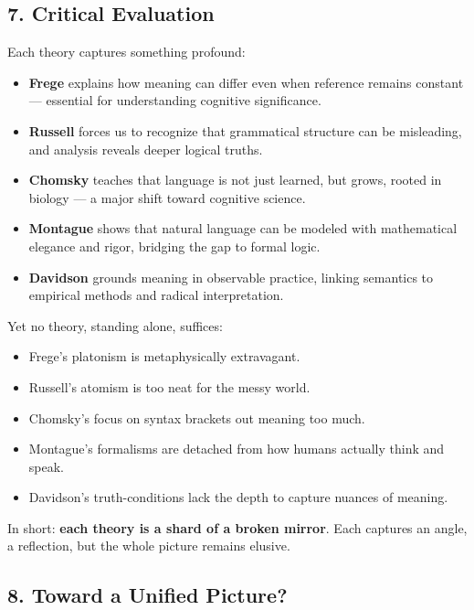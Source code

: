 \documentclass[12pt]{article}
\newcommand{\tightlist}{\itemsep 0pt\parskip 0pt\parsep 0pt}
\begin{document}
\hypertarget{critical-evaluation-1}{%
\subsection{7. Critical Evaluation}\label{critical-evaluation-1}}

Each theory captures something profound:

\begin{itemize}
\tightlist
\item
  \textbf{Frege} explains how meaning can differ even when reference
  remains constant --- essential for understanding cognitive
  significance.
\item
  \textbf{Russell} forces us to recognize that grammatical structure can
  be misleading, and analysis reveals deeper logical truths.
\item
  \textbf{Chomsky} teaches that language is not just learned, but grows,
  rooted in biology --- a major shift toward cognitive science.
\item
  \textbf{Montague} shows that natural language can be modeled with
  mathematical elegance and rigor, bridging the gap to formal logic.
\item
  \textbf{Davidson} grounds meaning in observable practice, linking
  semantics to empirical methods and radical interpretation.
\end{itemize}

Yet no theory, standing alone, suffices:

\begin{itemize}
\tightlist
\item
  Frege's platonism is metaphysically extravagant.
\item
  Russell's atomism is too neat for the messy world.
\item
  Chomsky's focus on syntax brackets out meaning too much.
\item
  Montague's formalisms are detached from how humans actually think and
  speak.
\item
  Davidson's truth-conditions lack the depth to capture nuances of
  meaning.
\end{itemize}

In short: \textbf{each theory is a shard of a broken mirror}. Each
captures an angle, a reflection, but the whole picture remains elusive.

\hypertarget{toward-a-unified-picture}{%
\subsection{8. Toward a Unified
Picture?}\label{toward-a-unified-picture}}
\end{document}

